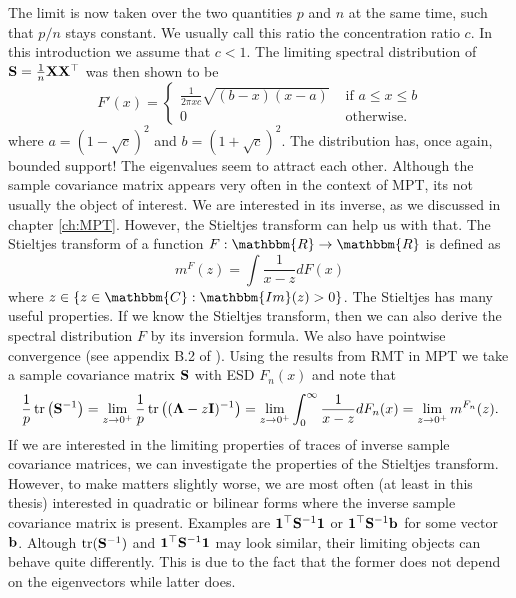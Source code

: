 \documentclass[oneside]{book}\usepackage{knitr}
\begin{document}
The limit is now taken over the two quantities $p$ and $n$ at the same time, such that $p/n$ stays constant.
We usually call this ratio the concentration ratio $c$.
In this introduction we assume that $c<1$. 
The limiting spectral distribution of $\mathbf{S}=\frac{1}{n} \mathbf{X} \mathbf{X}^\top$ was then shown to be
$$
F'(x) = \begin{cases}
\frac{1}{2\pi x c} \sqrt{(b-x)(x-a)} & \text{ if } a \leq x \leq b\\
0 & \text{ otherwise.}
\end{cases}
$$
where $a=(1-\sqrt{c})^2$ and $b=(1+\sqrt{c})^2$. The distribution has, once again, bounded support! 
The eigenvalues seem to attract each other. 
Although the sample covariance matrix appears very often in the context of MPT, its not usually the object of interest. 
We are interested in its inverse, as we discussed in chapter \ref{ch:MPT}. 
However, the Stieltjes transform can help us with that. 
The Stieltjes transform of a function $F: \mathbbm{R} \rightarrow \mathbbm{R}$ is defined as 
\begin{equation}\label{eqn:stieltjes}
m^F(z) = \int \frac{1}{x-z}dF(x)
\end{equation}
where $z \in \{z \in \mathbbm{C}: \mathbbm{Im}(z)>0 \}$. 
The Stieltjes has many useful properties. 
If we know the Stieltjes transform, then we can also derive the spectral distribution $F$ by its inversion formula. 
We also have pointwise convergence (see appendix B.2 of \citet{bai2010spectral}). 
Using the results from RMT in MPT we take a sample covariance matrix $\mathbf{S}$ with ESD $F_n(x)$ and note that
\begin{equation}
\frac{1}{p}\operatorname{tr} \left( \mathbf{S}^{-1} \right) = \lim_{z\rightarrow 0^+} \frac{1}{p} \operatorname{tr} \left( (\boldsymbol{\Lambda} -z\mathbf{I})^{-1} \right) = \lim_{z\rightarrow 0^+} \int_0^\infty \frac{1}{x - z} dF_n(x) = \lim_{z\rightarrow 0^+} m^{F_n}(z).
\end{equation}
If we are interested in the limiting properties of traces of inverse sample covariance matrices, we can investigate the properties of the Stieltjes transform. 
However, to make matters slightly worse, we are most often (at least in this thesis) interested in quadratic or bilinear forms where the inverse sample covariance matrix is present. 
Examples are $\mathbf{1}^\top \mathbf{S}^{-1} \mathbf{1}$ or $\mathbf{1}^\top \mathbf{S}^{-1} \mathbf{b}$ for some vector $\mathbf{b}$. 
Altough $\operatorname{tr}(\mathbf{S}^{-1})$ and $\mathbf{1}^\top \mathbf{S}^{-1} \mathbf{1}$ may look similar, their limiting objects can behave quite differently. 
This is due to the fact that the former does not depend on the eigenvectors while latter does. 
\end{document}
